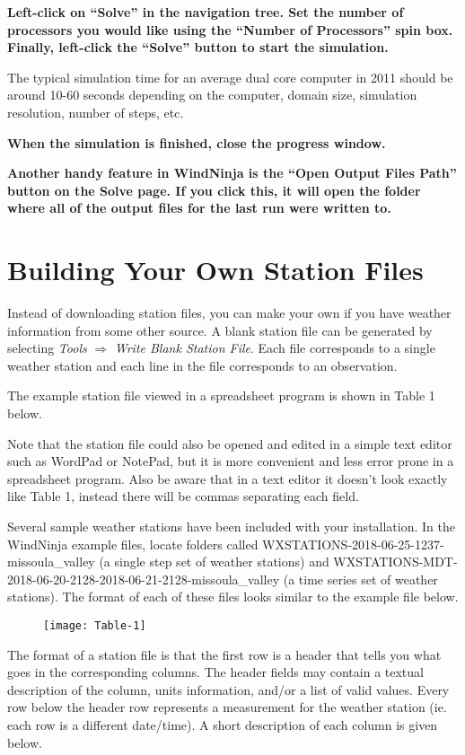 \documentclass[12pt]{article}
\begin{document}
\textbf{\color{red}Left-click on “Solve” in the navigation tree.  Set the number of processors you would like using the “Number of Processors” spin box.  Finally, left-click the “Solve” button to start the simulation.}

The typical simulation time for an average dual core computer in 2011 should be around 10-60 seconds depending on the computer, domain size, simulation resolution, number of steps, etc.

\textbf{\color{red} When the simulation is finished, close the progress window.}

\textbf{\color{red}Another handy feature in WindNinja is the “Open Output Files Path” button on the Solve page.  If you click this, it will open the folder where all of the output files for the last run were written to.}

\section{Building Your Own Station Files}\label{growyourown}

Instead of downloading station files, you can make your own if you have weather information from some other source.  A blank station file can be generated by selecting \textit{Tools} $\Rightarrow$ \textit{Write Blank Station File}. Each file corresponds to a single weather station and each line in the file corresponds to an observation.

The example station file viewed in a spreadsheet program is shown in Table 1 below.

Note that the station file could also be opened and edited in a simple text editor such as WordPad or NotePad, but it is more convenient and less error prone in a spreadsheet program.  Also be aware that in a text editor it doesn't look exactly like Table 1, instead there will be commas separating each field.

Several sample weather stations have been included with your installation. In the WindNinja example files, locate folders called WXSTATIONS-2018-06-25-1237-missoula\_valley (a single step set of weather stations) and WXSTATIONS-MDT-2018-06-20-2128-2018-06-21-2128-missoula\_valley (a time series set of weather stations). The format of each of these files looks similar to the example file below.

\begin{landscape}
\begin{figure}[H]
	\centering
	\label{}
	\texttt{[image: Table-1]}
\end{figure}
\end{landscape}
The format of a station file is that the first row is a header that tells you what goes in the corresponding columns.  The header fields may contain a textual description of the column, units information, and/or a list of valid values.  Every row below the header row represents a measurement for the weather station (ie. each row is a different date/time).  A short description of each column is given below.
\end{document}
